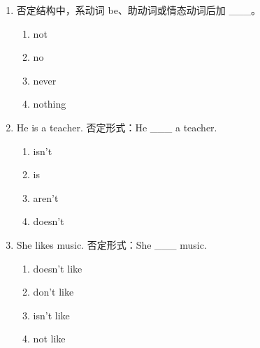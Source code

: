 \documentclass[11pt,a4paper]{ctexart}
\begin{document}
\begin{enumerate}[leftmargin=*,itemsep=4pt]
\begin{enumerate}[label=\Alph*.,leftmargin=2em,itemsep=1pt,topsep=2pt]
\item 感叹号
\item 逗号
\end{enumerate}
\item 否定结构中，系动词 be、助动词或情态动词后加 \_\_\_。
\begin{enumerate}[label=\Alph*.,leftmargin=2em,itemsep=1pt,topsep=2pt]
\item not
\item no
\item never
\item nothing
\end{enumerate}
\item He is a teacher. 否定形式：He \_\_\_ a teacher.
\begin{enumerate}[label=\Alph*.,leftmargin=2em,itemsep=1pt,topsep=2pt]
\item isn’t
\item is
\item aren’t
\item doesn’t
\end{enumerate}
\item She likes music. 否定形式：She \_\_\_ music.
\begin{enumerate}[label=\Alph*.,leftmargin=2em,itemsep=1pt,topsep=2pt]
\item doesn’t like
\item don’t like
\item isn’t like
\item not like
\end{enumerate}
\end{enumerate}
\end{document}
